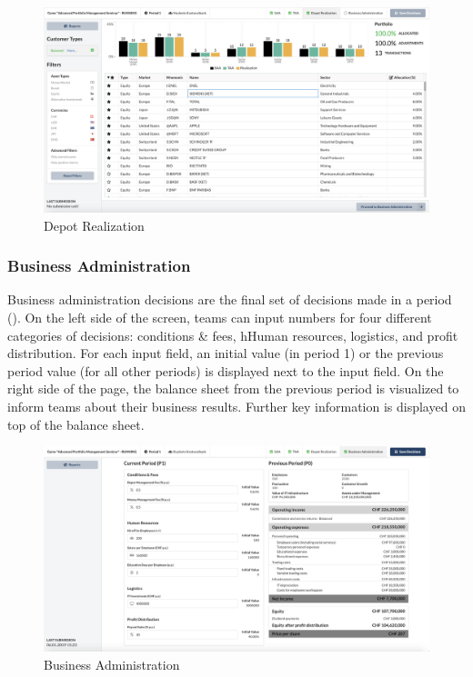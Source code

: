 \begin{figure}[h!]
  \centering
  \includegraphics[scale=0.2]{img/application-overview/teams/05_depot_realization.png}
  \caption{Depot Realization}
  \label{fig:depot_realization}
\end{figure}

\subsubsection{Business Administration}
Business administration decisions are the final set of decisions made in a period (). On the left side of the screen, teams can input numbers for four different categories of decisions: conditions \& fees, hHuman resources, logistics, and profit distribution. For each input field, an initial value (in period 1) or the previous period value (for all other periods) is displayed next to the input field. On the right side of the page, the balance sheet from the previous period is visualized to inform teams about their business results. Further key information is displayed on top of the balance sheet.
\begin{figure}[h!]
  \centering
  \includegraphics[scale=0.2]{img/application-overview/teams/06_business.png}
  \caption{Business Administration}
  \label{fig:business_admin}
\end{figure}


